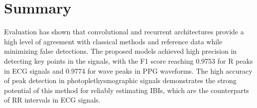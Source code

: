 \documentclass[journal]{IEEEtran}
\begin{document}
\section{Summary}
Evaluation has shown that convolutional and recurrent architectures provide a high level of agreement with classical methods and reference data while minimizing false detections. The proposed models achieved high precision in detecting key points in the signals, with the F1 score reaching 0.9753 for R peaks in ECG signals and 0.9774 for wave peaks in PPG waveforms. The high accuracy of peak detection in photoplethysmographic signals demonstrates the strong potential of this method for reliably estimating IBIs, which are the counterparts of RR intervals in ECG signals.
\end{document}
